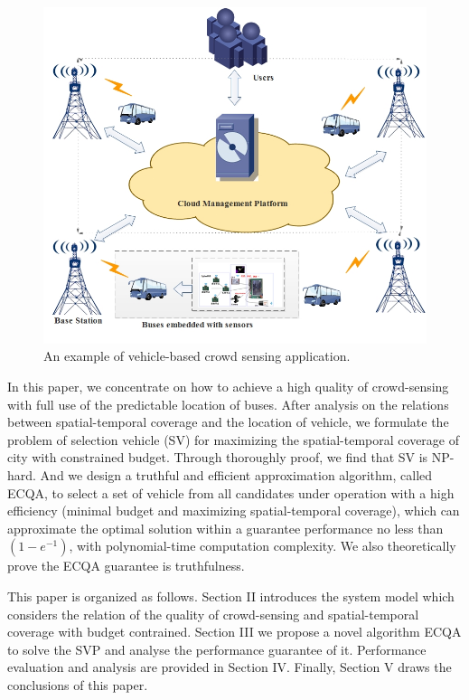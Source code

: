 \documentclass[journal]{IEEEtran}
\begin{document}
\begin{figure}[t]
	\centering
	\includegraphics[width=1.0\linewidth]{Figure1.png}
	\caption[Fig.1]{An example of vehicle-based crowd sensing application.}
	\label{Figure1}
\end{figure}

In this paper, we concentrate on how to achieve a high quality of crowd-sensing with full use of the predictable location of buses. After analysis on the relations between spatial-temporal coverage and the location of vehicle, we formulate the problem of selection vehicle (SV) for maximizing the spatial-temporal coverage of city with constrained budget. Through thoroughly proof, we find that SV is NP-hard. And we design a truthful and efficient approximation algorithm, called ECQA, to select a set of vehicle from all candidates under operation with a high efficiency (minimal budget and maximizing spatial-temporal coverage), which can approximate the optimal solution within a guarantee performance no less than $\left ( 1-e^{-1} \right )$, with polynomial-time computation complexity. We also theoretically prove the ECQA guarantee is truthfulness.

This paper is organized as follows. Section II introduces the system model which considers the relation of the quality of crowd-sensing and spatial-temporal coverage with budget contrained. Section III we propose a novel algorithm ECQA to solve the SVP and analyse the performance guarantee of it. Performance evaluation and analysis are provided in Section IV. Finally, Section V draws the conclusions of this paper.
\end{document}
